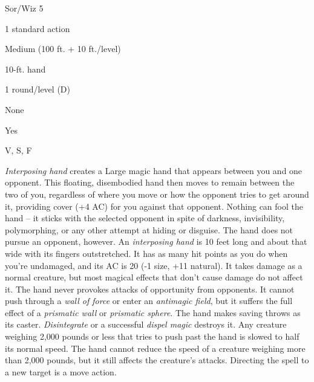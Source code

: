 
\begin{description*}
\item[Level:] Sor/Wiz 5
\item[Casting Time:] 1 standard action
\item[Range:] Medium (100 ft. + 10 ft./level)
\item[Effect:] 10-ft. hand
\item[Duration:] 1 round/level (D)
\item[Saving Throw:] None
\item[Spell Resistance:] Yes
\item[Components:] V, S, F
\end{description*}

\textit{Interposing hand} creates a Large magic hand that appears between you and
one opponent. This floating, disembodied hand then moves to remain between the
two of you, regardless of where you move or how the opponent tries to get around
it, providing cover (+4 AC) for you against that opponent. Nothing can fool the
hand -- it sticks with the selected opponent in spite of darkness, invisibility,
polymorphing, or any other attempt at hiding or disguise. The hand does not pursue
an opponent, however.
An \textit{interposing hand} is 10 feet long and about that wide with its fingers
outstretched. It has as many hit points as you do when you're undamaged, and its
AC is 20 (-1 size, +11 natural). It takes damage as a normal creature, but most
magical effects that don't cause damage do not affect it.
The hand never provokes attacks of opportunity from opponents. It cannot push through
a \textit{wall of force} or enter an \textit{antimagic field}, but it suffers the
full effect of a \textit{prismatic wall} or \textit{prismatic sphere}. The hand
makes saving throws as its caster.
\textit{Disintegrate} or a successful \textit{dispel magic} destroys it.
Any creature weighing 2,000 pounds or less that tries to push past the hand is
slowed to half its normal speed. The hand cannot reduce the speed of a creature
weighing more than 2,000 pounds, but it still affects the creature's attacks.
Directing the spell to a new target is a move action.